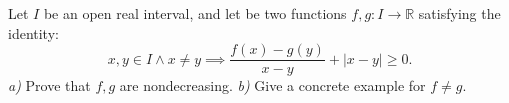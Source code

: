 Let $ I $ be an open real interval, and let be two functions $ f,g:I\longrightarrow\mathbb{R} $ satisfying the identity:
$$ x,y\in I\wedge x\neq y\implies\frac{f(x)-g(y)}{x-y} +|x-y|\ge 0. $$
\textit{a)} Prove that $ f,g $ are nondecreasing.
\textit{b)} Give a concrete example for $ f\neq g. $